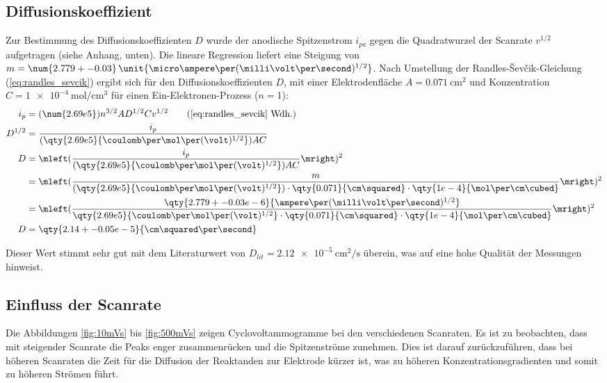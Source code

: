 \subsection{Diffusionskoeffizient}
Zur Bestimmung des Diffusionskoeffizienten $D$ wurde der anodische Spitzenstrom $i_{pa}$ gegen die Quadratwurzel der Scanrate $v^{1/2}$ aufgetragen (siehe Anhang, unten).
Die lineare Regression liefert eine Steigung von $m = \num{2.779 +- 0.03} \, \unit{\micro\ampere\per(\milli\volt\per\second)^{1/2}}$.
Nach Umstellung der Randles-\v{S}ev\v{c}ik-Gleichung (\autoref{eq:randles_sevcik}) ergibt sich für den Diffusionskoeffizienten $D$,
mit einer Elektrodenfläche $A = \qty{0.071}{\cm\squared}$ und Konzentration $C = \qty{1e-4}{\mol\per\cm\cubed}$ für einen Ein-Elektronen-Prozess ($n = 1$):
\begin{align*}
    i_p &= (\num{2.69e5}) n^{3/2} A D^{1/2} C v^{1/2} \tag{\ref{eq:randles_sevcik} Wdh.} \\
    D^{1/2} &= \frac{i_p}{(\qty{2.69e5}{\coulomb\per\mol\per(\volt)^{1/2}}) A C} \\
    D &= \mleft( \frac{i_p}{(\qty{2.69e5}{\coulomb\per\mol\per(\volt)^{1/2}}) A C} \mright)^2 \\
      &= \mleft( \frac{m}{(\qty{2.69e5}{\coulomb\per\mol\per(\volt)^{1/2}}) \cdot \qty{0.071}{\cm\squared} \cdot \qty{1e-4}{\mol\per\cm\cubed}} \mright)^2 \\
      &= \mleft( \frac{\qty{2.779 +- 0.03e-6}{\ampere\per(\milli\volt\per\second)^{1/2}}}{\qty{2.69e5}{\coulomb\per\mol\per(\volt)^{1/2}} \cdot \qty{0.071}{\cm\squared} \cdot \qty{1e-4}{\mol\per\cm\cubed}} \mright)^2 \\
    D &= \qty{2.14 +- 0.05e-5}{\cm\squared\per\second}
\end{align*}

Dieser Wert stimmt sehr gut mit dem Literaturwert von $D_{lit} = \qty{2.12e-5}{\cm\squared\per\second}$\autocite{wang2010measurement} überein, was auf eine hohe Qualität der Messungen hinweist.

\subsection{Einfluss der Scanrate}
Die Abbildungen \ref{fig:10mVs} bis \ref{fig:500mVs} zeigen Cyclovoltammogramme bei den verschiedenen Scanraten.
Es ist zu beobachten, dass mit steigender Scanrate die Peaks enger zusammenrücken und die Spitzenströme zunehmen.
Dies ist darauf zurückzuführen, dass bei höheren Scanraten die Zeit für die Diffusion der Reaktanden zur Elektrode kürzer ist, was zu höheren Konzentrationsgradienten und somit zu höheren Strömen führt.


